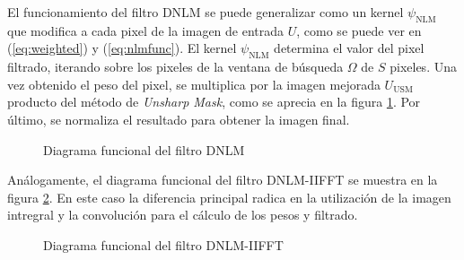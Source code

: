 El funcionamiento del filtro DNLM se puede generalizar como un kernel $\psi_{\textrm{NLM}}$ que modifica a cada pixel de la imagen de entrada $U$, como se puede ver en (\ref{eq:weighted}) y (\ref{eq:nlmfunc}). El kernel $\psi_{\textrm{NLM}}$ determina el valor del pixel filtrado, iterando sobre los pixeles de la ventana de b\'usqueda $\Omega$ de $S$ pixeles. Una vez obtenido el peso del pixel, se multiplica por la imagen mejorada $U_{\textrm{USM}}$ producto del m\'etodo de \textit{Unsharp Mask}, como se aprecia en la figura \ref{fig:diagramabloqDNLM}.  Por \'ultimo, se normaliza el resultado para obtener la imagen final. 

\begin{figure}
\centering
{}
\caption[Diagrama funcional del filtro DNLM]{Diagrama funcional del filtro DNLM\label{fig:diagramabloqDNLM}}
\end{figure}

An\'alogamente, el diagrama funcional del filtro DNLM-IIFFT se muestra en la figura \ref{fig:diagramabloqDNLMiifft}. En este caso la diferencia principal radica en la utilizaci\'on de la imagen intregral y la convoluci\'on para el c\'alculo de los pesos y filtrado. 



\begin{figure}
\centering
{}
\caption[Diagrama funcional del filtro DNLM-IIFFT]{Diagrama funcional del filtro DNLM-IIFFT\label{fig:diagramabloqDNLMiifft}}
\end{figure}


